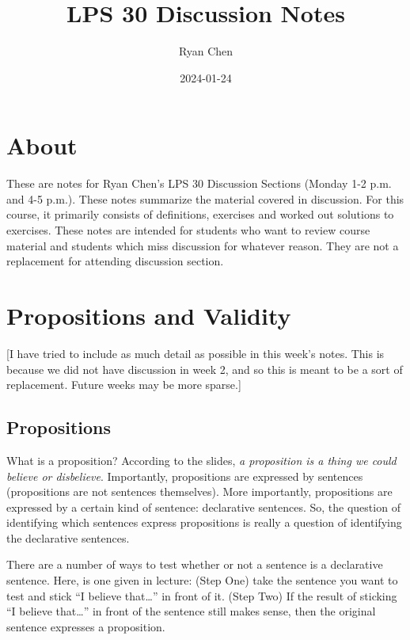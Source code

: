 \documentclass[
]{book}
\title{LPS 30 Discussion Notes}
\author{Ryan Chen}
\date{2024-01-24}
\begin{document}
\maketitle

{
\setcounter{tocdepth}{1}
\tableofcontents
}
\hypertarget{about}{%
\chapter{About}\label{about}}

These are notes for Ryan Chen's LPS 30 Discussion Sections (Monday 1-2 p.m. and 4-5 p.m.). These notes summarize the material covered in discussion. For this course, it primarily consists of definitions, exercises and worked out solutions to exercises. These notes are intended for students who want to review course material and students which miss discussion for whatever reason. They are not a replacement for attending discussion section.

\hypertarget{propositions-and-validity}{%
\chapter{Propositions and Validity}\label{propositions-and-validity}}

{[}I have tried to include as much detail as possible in this week's notes. This is because we did not have discussion in week 2, and so this is meant to be a sort of replacement. Future weeks may be more sparse.{]}

\hypertarget{propositions}{%
\section{Propositions}\label{propositions}}

What is a proposition? According to the slides, \emph{a proposition is a thing we could believe or disbelieve}. Importantly, propositions are expressed by sentences (propositions are not sentences themselves). More importantly, propositions are expressed by a certain kind of sentence: declarative sentences. So, the question of identifying which sentences express propositions is really a question of identifying the declarative sentences.

There are a number of ways to test whether or not a sentence is a declarative sentence. Here, is one given in lecture: (Step One) take the sentence you want to test and stick ``I believe that\ldots{}'' in front of it. (Step Two) If the result of sticking ``I believe that\ldots{}'' in front of the sentence still makes sense, then the original sentence expresses a proposition.
\end{document}
